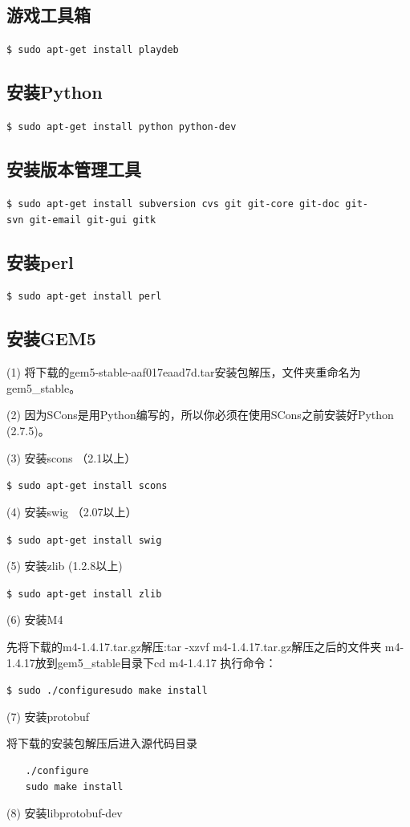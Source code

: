 \subsection{游戏工具箱}
\verb"$ sudo apt-get install playdeb"

\subsection{安装Python}
\verb"$ sudo apt-get install python python-dev"

\subsection{安装版本管理工具}
\verb"$ sudo apt-get install subversion cvs git git-core git-doc git-svn git-email git-gui gitk"

\subsection{安装perl}
\verb"$ sudo apt-get install perl"

\subsection{安装GEM5}
(1) 将下载的gem5-stable-aaf017eaad7d.tar安装包解压，文件夹重命名为gem5\_stable。

(2) 因为SCons是用Python编写的，所以你必须在使用SCons之前安装好Python (2.7.5)。

(3) 安装scons （2.1以上）

\verb"$ sudo apt-get install scons"

(4) 安装swig （2.07以上）

\verb"$ sudo apt-get install swig"

(5) 安装zlib (1.2.8以上)

\verb"$ sudo apt-get install zlib"

(6) 安装M4

先将下载的m4-1.4.17.tar.gz解压:tar -xzvf m4-1.4.17.tar.gz解压之后的文件夹 m4-1.4.17放到gem5\_stable目录下cd m4-1.4.17
执行命令：

\verb"$ sudo ./configuresudo make install"

(7) 安装protobuf

将下载的安装包解压后进入源代码目录
\begin{verbatim}
　　./configure
　　sudo make install
\end{verbatim}

(8) 安装libprotobuf-dev

